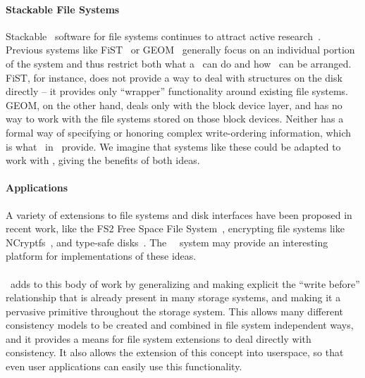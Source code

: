 \paragraph{Stackable File Systems}


Stackable \module\ software for file systems continues to attract active
research~\cite{rosenthal90evolving, heidemann91layered, skinner93stacking,
heidemann94filesystem,zadok99extending,
zadok00fist,wright03ncryptfs,wright06versatility}. Previous
systems like FiST~\cite{zadok00fist} or GEOM~\cite{geom} generally focus on
an individual portion of the system and thus restrict both what a \module\
can do and how \modules\ can be arranged. FiST, for instance, does not
provide a way to deal with structures on the disk directly -- it provides
only ``wrapper'' functionality around existing file
systems. %
GEOM, on the other hand, deals only with the block device layer, and has no
way to work with the file systems stored on those block devices. Neither
has a formal way of specifying or honoring complex write-ordering
information, which is what \patches\ in \Kudos\ provide. We imagine that
systems like these could be adapted to work with \patches, giving the
benefits of both ideas.

\paragraph{Applications}

A variety of extensions to file systems and disk interfaces have been proposed
in recent work, like the FS2 Free Space File System~\cite{huang05fs2},
encrypting file systems like NCryptfs~\cite{wright03ncryptfs}, and type-safe
disks~\cite{sivathanu06typesafe}. The \Kudos\
\module\ system may provide an interesting platform for implementations 
of these ideas.

\paragraph{} \Kudos\ adds to this body of work by generalizing and making
explicit the ``write before'' relationship that is already present in many
storage systems, and making it a pervasive primitive throughout the storage
system. This allows many different consistency models to be created and
combined in file system independent ways, and it provides a means for file
system extensions to deal directly with consistency. It also allows the
extension of this concept into userspace, so that even user applications
can easily use this functionality.
